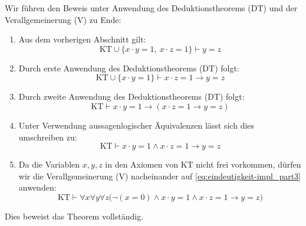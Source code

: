 \begin{math-stroke}
Wir führen den Beweis unter Anwendung des Deduktionstheorems ($\text{DT}$) und der Verallgemeinerung ($\text{V}$) zu Ende:

\begin{short-proof}
\begin{enumerate}[label=\textbf{(\arabic*)}]
    \item Aus dem vorherigen Abschnitt gilt:
    \[ \text{KT} \cup \{x \cdot y = 1, \ x \cdot z = 1\} \vdash y = z \]
    \item Durch erste Anwendung des Deduktionstheorems ($\text{DT}$) folgt:
    \[ \text{KT} \cup \{x \cdot y = 1\} \vdash x \cdot z = 1 \rightarrow y = z \]
    \item Durch zweite Anwendung des Deduktionstheorems ($\text{DT}$) folgt:
    \[ \text{KT} \vdash x \cdot y = 1 \rightarrow (x \cdot z = 1 \rightarrow y = z) \]
    \item Unter Verwendung aussagenlogischer Äquivalenzen lässt sich dies umschreiben zu:
    \begin{equation}\label{eq:eindeutigkeit-impl_part3}
    \text{KT} \vdash x \cdot y = 1 \wedge x \cdot z = 1 \rightarrow y = z
    \end{equation}
    \item Da die Variablen $x, y, z$ in den Axiomen von $\text{KT}$ nicht frei vorkommen, dürfen wir die Verallgemeinerung ($\text{V}$) nacheinander auf \eqref{eq:eindeutigkeit-impl_part3} anwenden:
    \[ \text{KT} \vdash \forall x \forall y \forall z \bigl(\neg(x = 0) \wedge x \cdot y = 1 \wedge x \cdot z = 1 \rightarrow y = z\bigr) \]
\end{enumerate}
Dies beweist das Theorem vollständig.
\end{short-proof}
\end{math-stroke}

